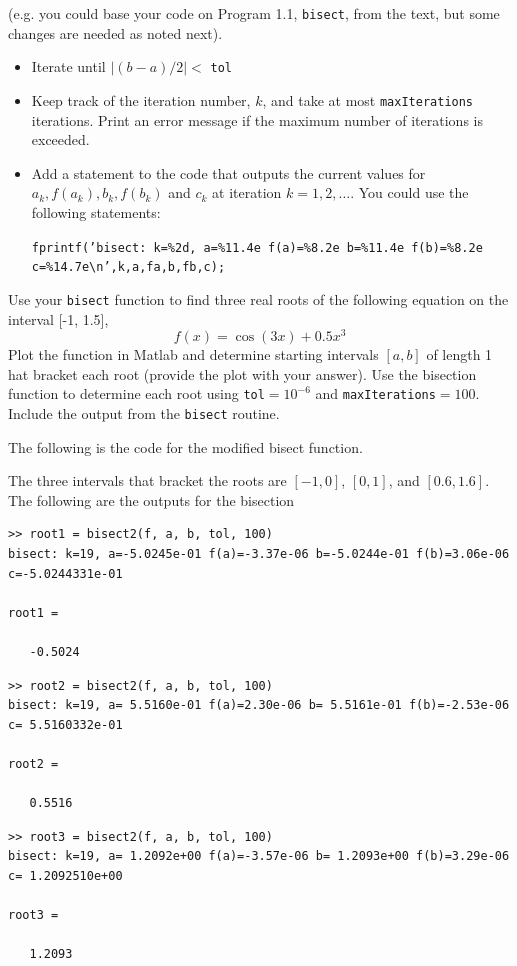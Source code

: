 \documentclass[10pt,letterpaper]{article}
\begin{document}
\noindent(e.g. you could base your code on Program 1.1, {\tt bisect}, from the text, but some changes are needed as noted next). 

\begin{itemize}

\item Iterate until $|(b - a) / 2| <$ {\tt tol}

\item Keep track of the iteration number, $k$, and take at most {\tt maxIterations} iterations. Print an error message if the maximum number of iterations is exceeded. 

\item Add a statement to the code that outputs the current values for $a_{k}, f(a_{k}), b_{k}, f(b_{k})$ and $c_{k}$ at iteration $k = 1, 2, \dots$. You could use the following statements:

{\tt fprintf('bisect: k=\%2d, a=\%11.4e f(a)=\%8.2e b=\%11.4e f(b)=\%8.2e c=\%14.7e\textbackslash n’,k,a,fa,b,fb,c);}

\end{itemize}

\noindent Use your {\tt bisect} function to find three real roots of the following equation on the interval [-1, 1.5],
$$f(x) = \cos(3x) + 0.5x^{3}$$
Plot the function in Matlab and determine starting intervals $[a, b]$ of length 1 hat bracket each root (provide the plot with your answer). Use the bisection function to determine each root using {\tt tol}$= 10^{-6}$ and {\tt maxIterations}$= 100$. Include the output from the {\tt bisect} routine.

\color{TangGreen}
The following is the code for the modified bisect function.



The three intervals that bracket the roots are $[-1, 0]$, $[0, 1]$, and $[0.6, 1.6]$. The following are the outputs for the bisection 

\begin{lstlisting}[frame=single,caption={The first root},label=root1]
>> root1 = bisect2(f, a, b, tol, 100)
bisect: k=19, a=-5.0245e-01 f(a)=-3.37e-06 b=-5.0244e-01 f(b)=3.06e-06 c=-5.0244331e-01

root1 =

   -0.5024
\end{lstlisting}
\begin{lstlisting}[frame=single,caption={The second root},label=root2]
>> root2 = bisect2(f, a, b, tol, 100)
bisect: k=19, a= 5.5160e-01 f(a)=2.30e-06 b= 5.5161e-01 f(b)=-2.53e-06 c= 5.5160332e-01

root2 =

   0.5516
\end{lstlisting}
\begin{lstlisting}[frame=single,caption={The third root},label=root3]
>> root3 = bisect2(f, a, b, tol, 100)
bisect: k=19, a= 1.2092e+00 f(a)=-3.57e-06 b= 1.2093e+00 f(b)=3.29e-06 c= 1.2092510e+00

root3 =

   1.2093
\end{lstlisting}
\end{document}
